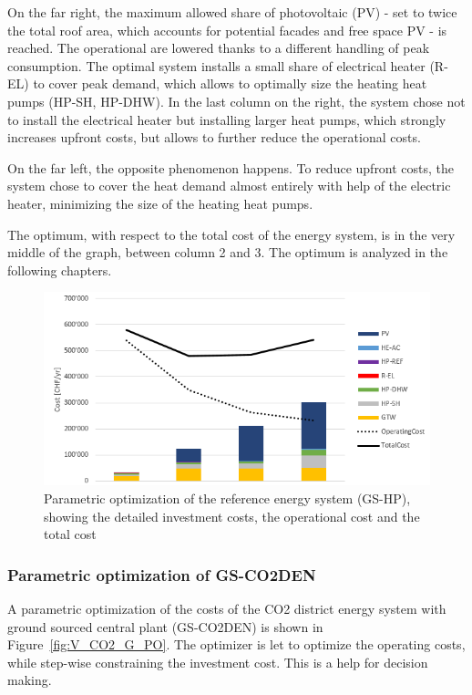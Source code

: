 \documentclass{article}
\begin{document}
On the far right, the maximum allowed share of photovoltaic (PV) - set to twice the total roof area, which accounts for potential facades and free space PV - is reached. The operational are lowered thanks to a different handling of peak consumption. The optimal system installs a small share of electrical heater (R-EL) to cover peak demand, which allows to optimally size the heating heat pumps (HP-SH, HP-DHW). In the last column on the right, the system chose not to install the electrical heater but installing larger heat pumps, which strongly increases upfront costs, but allows to further reduce the operational costs.

On the far left, the opposite phenomenon happens. To reduce upfront costs, the system chose to cover the heat demand almost entirely with help of the electric heater, minimizing the size of the heating heat pumps.

The optimum, with respect to the total cost of the energy system, is in the very middle of the graph, between column 2 and 3. The optimum is analyzed in the following chapters.

\begin{figure}[htp]
	\centering
	\includegraphics[width=1\textwidth]{V_G_PO1.png}
	\caption{Parametric optimization of the reference energy system (GS-HP), showing the detailed investment costs, the operational cost and the total cost}
	\label{fig:V_G_PO}
\end{figure}

\subsubsection{Parametric optimization of GS-CO2DEN}
A parametric optimization of the costs of the CO2 district energy system with ground sourced central plant (GS-CO2DEN) is shown in Figure~\ref{fig:V_CO2_G_PO}. The optimizer is let to optimize the operating costs, while step-wise constraining the investment cost. This is a help for decision making.
\end{document}
